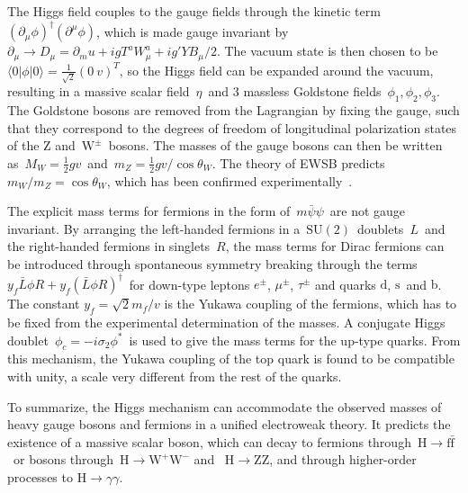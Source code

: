 The Higgs field couples to the gauge fields through the kinetic term~$(\partial_{\mu} \phi)^\dagger (\partial^\mu \phi)$, which is made gauge invariant by~$\partial_\mu \rightarrow D_\mu = \partial_mu + i g T^a W_\mu^a + i g' Y B_\mu / 2$. The vacuum state is then chosen to be~$\langle 0|\phi|0\rangle = \frac{1}{\sqrt{2}} (0\ v)^T$, so the Higgs field can be expanded around the vacuum, resulting in a massive scalar field~$\eta$~and 3 massless Goldstone fields~$\phi_1, \phi_2, \phi_3$. The Goldstone bosons are removed from the Lagrangian by fixing the gauge, such that they correspond to the degrees of freedom of longitudinal polarization states of the Z and~$\mathrm{W}^\pm$~bosons. The masses of the gauge bosons can then be written as~$M_W = \frac{1}{2} g v$~and~$m_Z = \frac{1}{2} g v / \cos{\theta_W}$. The theory of EWSB predicts~$m_W / m_Z = \cos{\theta_W}$, which has been confirmed experimentally~\cite{ALEPH:2005ab}.

The explicit mass terms for fermions in the form of~$m \bar{\psi} \psi$~are not gauge invariant. By arranging the left-handed fermions in a~$\mathrm{SU}(2)$~doublets~$L$~and the right-handed fermions in singlets~$R$, the mass terms for Dirac fermions can be introduced through spontaneous symmetry breaking through the terms~$y_f \bar{L}\phi R + y_f (\bar{L}\phi R)^\dagger$~for down-type leptons $e^\pm$, $\mu^\pm$, $\tau^\pm$ and quarks $\mathrm{d}$, $\mathrm{s}$~and $\mathrm{b}$. The constant $y_f = \sqrt{2} m_f / v$ is the Yukawa coupling of the fermions, which has to be fixed from the experimental determination of the masses. A conjugate Higgs doublet~$\phi_c = -i\sigma_2 \phi^*$~is used to give the mass terms for the up-type quarks. From this mechanism, the Yukawa coupling of the top quark is found to be compatible with unity, a scale very different from the rest of the quarks.

To summarize, the Higgs mechanism can accommodate the observed masses of heavy gauge bosons and fermions in a unified electroweak theory. It predicts the existence of a massive scalar boson, which can decay to fermions through~$\mathrm{H} \rightarrow \mathrm{f} \bar{\mathrm{f}}$~or bosons through~$\mathrm{H} \rightarrow \mathrm{W}^+ \mathrm{W}^-$ and ~$\mathrm{H} \rightarrow \mathrm{Z} \mathrm{Z}$, and through higher-order processes to $\mathrm{H} \rightarrow \gamma \gamma$.


